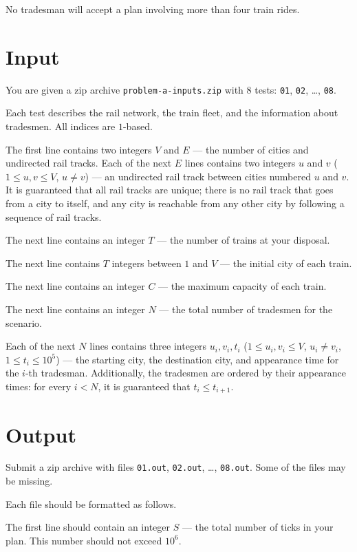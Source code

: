 \documentclass[11pt]{article}
\begin{document}
No tradesman will accept a plan involving more than four train rides.

\section*{Input}

You are given a zip archive \texttt{problem-a-inputs.zip} with $8$ tests: \texttt{01}, \texttt{02}, \ldots, \texttt{08}.

Each test describes the rail network, the train fleet, and the information about tradesmen. All indices are $1$-based.

The first line contains two integers $V$ and $E$ --- the number of cities and undirected rail tracks. Each of the next $E$ lines contains two integers $u$ and $v$ ($1 \le u,v \le V$, $u \ne v$) --- an undirected rail track between cities numbered $u$ and $v$. It is guaranteed that all rail tracks are unique; there is no rail track that goes from a city to itself, and any city is reachable from any other city by following a sequence of rail tracks.

The next line contains an integer $T$ --- the number of trains at your disposal.

The next line contains $T$ integers between $1$ and $V$ --- the initial city of each train.

The next line contains an integer $C$ --- the maximum capacity of each train.

The next line contains an integer $N$ --- the total number of tradesmen for the scenario.

Each of the next $N$ lines contains three integers $u_i, v_i, t_i$ ($1 \le u_i,v_i \le V$, $u_i \ne v_i$, $1 \le t_i \le 10^5$) --- the starting city, the destination city, and appearance time for the $i$-th tradesman. Additionally, the tradesmen are ordered by their appearance times: for every $i < N$, it is guaranteed that $t_i \le t_{i+1}$.

\section*{Output}

Submit a zip archive with files \texttt{01.out}, \texttt{02.out}, \ldots, \texttt{08.out}. Some of the files may be missing.

Each file should be formatted as follows.

The first line should contain an integer $S$ --- the total number of ticks in your plan. This number should not exceed $10^6$.
\end{document}
